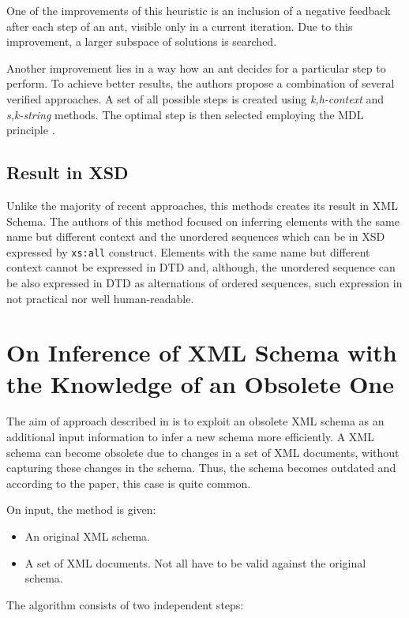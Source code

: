 One of the improvements of this heuristic is an inclusion of a negative feedback after each step of an ant, visible only in a current iteration. Due to this improvement, a larger subspace of solutions is searched.

Another improvement lies in a way how an ant decides for a particular step to perform. To achieve better results, the authors propose a combination of several verified approaches. A set of all possible steps is created using \emph{k,h-context} \cite{Ahonen1996GeneratingGrammars} and \emph{s,k-string} \cite{Raman97thesk-strings, Wong03onstructural} methods. The optimal step is then selected employing the MDL principle \cite{Grünwald05atutorial, Garofalakis:2000:XSE:342009.335409}.

\subsection{Result in XSD}
Unlike the majority of recent approaches, this methods creates its result in XML Schema. The authors of this method focused on inferring elements with the same name but different context and the unordered sequences which can be in XSD expressed by \texttt{xs:all} construct. Elements with the same name but different context cannot be expressed in DTD and, although, the unordered sequence can be also expressed in DTD as alternations of ordered sequences, such expression in not practical nor well human-readable.

\section{On Inference of XML Schema with the Knowledge of an Obsolete One}
The aim of approach described in \cite{Mlynkova:2009:IXS:1862681.1862693} is to exploit an obsolete XML schema as an additional input information to infer a new schema more efficiently. A XML schema can become obsolete due to changes in a set of XML documents, without capturing these changes in the schema. Thus, the schema becomes outdated and according to the paper, this case is quite common.

On input, the method is given:
\begin{itemize}
\item An original XML schema.
\item A set of XML documents. Not all have to be valid against the original schema.
\end{itemize}

The algorithm consists of two independent steps:

